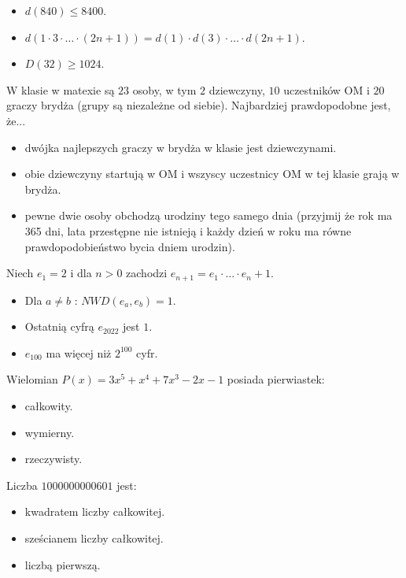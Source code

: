\documentclass[12pt, a4paper]{article}
\newcommand{\question}[1]{\normalitem \begin{samepage}#1 \end{samepage}}
\newcommand{\questionwithasterix}[1]{ \asterixitem \begin{samepage}#1 \vspace{6cm}\end{samepage}}
\newcommand{\cmark}{\textcolor{green}{T}}%
\newcommand{\xmark}{\textcolor{red}{N}}%
\newcommand{\yes}{\rlap{\framebox(15,15)} {\raisebox{2pt}{\large\hspace{-1pt}\cmark}}%
\hspace{3pt}}
\newcommand{\no}{\rlap{\framebox(15,15)} {\raisebox{2pt}{\large\hspace{-1pt}\xmark}}%
\hspace{3pt}}
\begin{document}
\begin{enumerate}
{		\begin{itemize}
			\item [\yes]$d(840) \leq 8400$.
			\item [\no]$d(1 \cdot 3 \cdot \ldots \cdot (2n+1)) = d(1) \cdot d(3) \cdot \ldots \cdot d(2n+1)$.
			\item [\no]$D(32) \geq 1024$.
		\end{itemize}
	}
	
	\question {
		W klasie w matexie są $23$ osoby, w tym $2$ dziewczyny, $10$ uczestników OM i $20$ graczy brydża (grupy są niezależne od siebie). Najbardziej prawdopodobne jest, że...
		
		\begin{itemize}
			\item [\no]dwójka najlepszych graczy w brydża w klasie jest dziewczynami.
			\item [\no]obie dziewczyny startują w OM i wszyscy uczestnicy OM w tej klasie grają w brydża.
			\item [\yes]pewne dwie osoby obchodzą urodziny tego samego dnia (przyjmij że rok ma 365 dni, lata przestępne nie istnieją i każdy dzień w roku ma równe prawdopodobieństwo bycia dniem urodzin).
		\end{itemize}
	}
	
	\questionwithasterix {
		Niech $e_1 = 2$ i dla $n>0$ zachodzi $e_{n+1} = e_1 \cdot \ldots \cdot e_n + 1$.
    
    	\begin{itemize}
			\item [\yes]Dla $a \ne b$ : $NWD(e_a, e_b) = 1$.
			\item [\no]Ostatnią cyfrą $e_{2022}$ jest $1$.
			\item [\no]$e_{100}$ ma więcej niż $2^{100}$ cyfr.
		\end{itemize}
	}
	
	\question {
		Wielomian $P(x) = 3x^5+x^4+7x^3-2x-1$ posiada pierwiastek:
	
		\begin{itemize}
			\item [\no]całkowity.
			\item [\no]wymierny.
			\item [\yes]rzeczywisty.
		\end{itemize}
	}
	
	\question {
		Liczba $1000000000601$ jest:
	
		\begin{itemize}
			\item [\no]kwadratem liczby całkowitej.
			\item [\no]sześcianem liczby całkowitej.
			\item [\no]liczbą pierwszą.
		\end{itemize}
	}
	

\end{enumerate}
\end{document}
